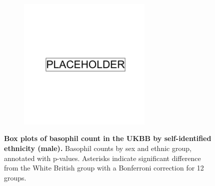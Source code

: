 \begin{figure}
    \centering
    \begin{subfigure}{\textwidth}
    \includegraphics[width=0.7\textwidth]{placeholder.png}
    \end{subfigure}
    \caption[Box plots of basophil count in the UKBB by self-identified ethnicity (male)]{\textbf{Box plots of basophil count in the UKBB by self-identified ethnicity (male).} Basophil counts by sex and ethnic group, annotated with p-values. Asterisks indicate significant difference from the White British group with a Bonferroni correction for 12 groups.}
    \label{fig:supp_box_basophill_m}
\end{figure}

\newpage

